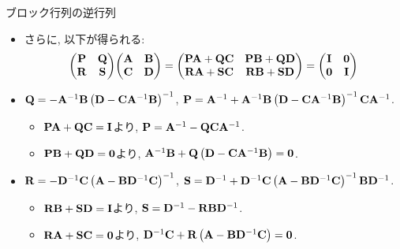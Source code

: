\documentclass[dvipdfmx,notheorems,t]{beamer}
\begin{document}
\begin{frame}{ブロック行列の逆行列}
\begin{itemize}
  \item さらに, 以下が得られる:
  \begin{gather*}
    \mqty(\vb{P} & \vb{Q} \\ \vb{R} & \vb{S}) \mqty(\vb{A} & \vb{B} \\ \vb{C} & \vb{D})
      = \mqty(\vb{P} \vb{A} + \vb{Q} \vb{C} & \vb{P} \vb{B} + \vb{Q} \vb{D} \\
        \vb{R} \vb{A} + \vb{S} \vb{C} & \vb{R} \vb{B} + \vb{S} \vb{D})
      = \mqty(\vb{I} & \vb{0} \\ \vb{0} & \vb{I})
  \end{gather*}
  \item $\vb{Q} = -\vb{A}^{-1} \vb{B} \left( \vb{D} - \vb{C} \vb{A}^{-1} \vb{B} \right)^{-1}$,
  $\vb{P} = \vb{A}^{-1} + \vb{A}^{-1} \vb{B} \left( \vb{D} - \vb{C} \vb{A}^{-1} \vb{B} \right)^{-1} \vb{C} \vb{A}^{-1}$.
  \begin{itemize}
    \item $\vb{P} \vb{A} + \vb{Q} \vb{C} = \vb{I}$より,
    $\vb{P} = \vb{A}^{-1} - \vb{Q} \vb{C} \vb{A}^{-1}$.
    \item $\vb{P} \vb{B} + \vb{Q} \vb{D} = \vb{0}$より,
    $\vb{A}^{-1} \vb{B} + \vb{Q} \left( \vb{D} - \vb{C} \vb{A}^{-1} \vb{B} \right) = \vb{0}$.
  \end{itemize}

  \item $\vb{R} = -\vb{D}^{-1} \vb{C} \left( \vb{A} - \vb{B} \vb{D}^{-1} \vb{C} \right)^{-1}$,
  $\vb{S} = \vb{D}^{-1} + \vb{D}^{-1} \vb{C} \left( \vb{A} - \vb{B} \vb{D}^{-1} \vb{C} \right)^{-1} \vb{B} \vb{D}^{-1}$.
  \begin{itemize}
    \item $\vb{R} \vb{B} + \vb{S} \vb{D} = \vb{I}$より, $\vb{S} = \vb{D}^{-1} - \vb{R} \vb{B} \vb{D}^{-1}$.
    \item $\vb{R} \vb{A} + \vb{S} \vb{C} = \vb{0}$より,
    $\vb{D}^{-1} \vb{C} + \vb{R} \left( \vb{A} - \vb{B} \vb{D}^{-1} \vb{C} \right) = \vb{0}$.
  \end{itemize}
\end{itemize}
\end{frame}
\end{document}
